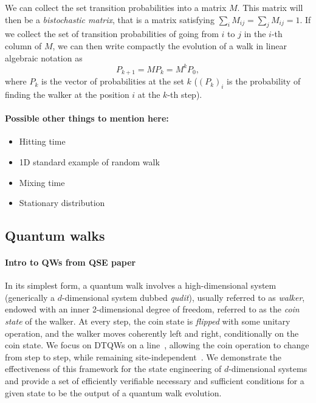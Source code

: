 We can collect the set transition probabilities into a matrix $M$. This matrix will then be a \textit{bistochastic matrix}, that is a matrix satisfying $\sum_i M_{ij}=\sum_j M_{ij}=1$. If we collect the set of transition probabilities of going from $i$ to $j$ in the $i$-th column of $M$, we can then write compactly the evolution of a walk in linear algebraic notation as
\begin{equation}
    P_{k+1} = M P_k = M^k P_0,
\end{equation}
where $P_k$ is the vector of probabilities at the set $k$ ($(P_k)_i$ is the probability of finding the walker at the position $i$ at the $k$-th step).

\paragraph{Possible other things to mention here:}
\begin{itemize}
    \item Hitting time
    \item 1D standard example of random walk
    \item Mixing time
    \item Stationary distribution
\end{itemize}


\subsection{Quantum walks}


\paragraph{Intro to QWs from QSE paper}
In its simplest form, a quantum walk involves a high-dimensional system (generically a $d$-dimensional system dubbed \textit{qudit}), usually referred to as \emph{walker}, endowed with an inner 2-dimensional degree of freedom, referred to as the \emph{coin state} of the walker. 
At every step, the coin state is \emph{flipped} with some unitary operation, and the walker moves coherently left and right, conditionally on the coin state.
We focus on \acp{DTQW} on a line~\cite{ambainis2001onedimensional}, allowing the coin operation to change from step to step, while remaining site-independent~\cite{ribeiro2004aperiodic,wjcik2004quasiperiodic,bauls2006quantum}.
We demonstrate the effectiveness of this framework for the state engineering of $d$-dimensional systems and provide a set of efficiently verifiable necessary and sufficient conditions for a given state to be the output of a quantum walk evolution.	

